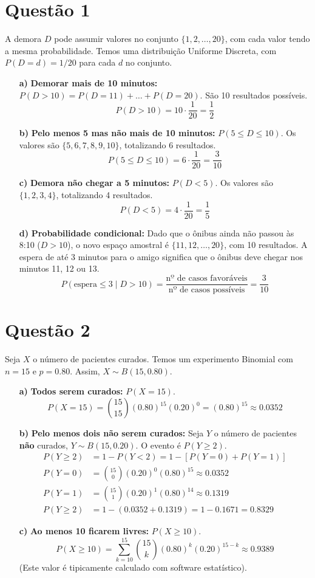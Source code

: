 \documentclass[12pt, a4paper]{article}
\begin{document}
\section*{Questão 1}
A demora $D$ pode assumir valores no conjunto $\{1, 2, \dots, 20\}$, com cada valor tendo a mesma probabilidade. Temos uma distribuição Uniforme Discreta, com $P(D=d) = 1/20$ para cada $d$ no conjunto.
\begin{itemize}
    \item[\textbf{a)}] \textbf{Demorar mais de 10 minutos:} $P(D > 10) = P(D=11) + \dots + P(D=20)$. São 10 resultados possíveis.
    $$ P(D > 10) = 10 \cdot \frac{1}{20} = \frac{1}{2} $$
    \item[\textbf{b)}] \textbf{Pelo menos 5 mas não mais de 10 minutos:} $P(5 \le D \le 10)$. Os valores são $\{5, 6, 7, 8, 9, 10\}$, totalizando 6 resultados.
    $$ P(5 \le D \le 10) = 6 \cdot \frac{1}{20} = \frac{3}{10} $$
    \item[\textbf{c)}] \textbf{Demora não chegar a 5 minutos:} $P(D < 5)$. Os valores são $\{1, 2, 3, 4\}$, totalizando 4 resultados.
    $$ P(D < 5) = 4 \cdot \frac{1}{20} = \frac{1}{5} $$
    \item[\textbf{d)}] \textbf{Probabilidade condicional:} Dado que o ônibus ainda não passou às 8:10 ($D > 10$), o novo espaço amostral é $\{11, 12, \dots, 20\}$, com 10 resultados. A espera de até 3 minutos para o amigo significa que o ônibus deve chegar nos minutos 11, 12 ou 13.
    $$ P(\text{espera} \le 3 \mid D > 10) = \frac{\text{nº de casos favoráveis}}{\text{nº de casos possíveis}} = \frac{3}{10} $$
\end{itemize}

\section*{Questão 2}
Seja $X$ o número de pacientes curados. Temos um experimento Binomial com $n=15$ e $p=0.80$. Assim, $X \sim B(15, 0.80)$.
\begin{itemize}
    \item[\textbf{a)}] \textbf{Todos serem curados:} $P(X=15)$.
    $$ P(X=15) = \binom{15}{15} (0.80)^{15} (0.20)^{0} = (0.80)^{15} \approx 0.0352 $$
    \item[\textbf{b)}] \textbf{Pelo menos dois não serem curados:} Seja $Y$ o número de pacientes \textbf{não} curados, $Y \sim B(15, 0.20)$. O evento é $P(Y \ge 2)$.
    \begin{align*}
    P(Y \ge 2) &= 1 - P(Y < 2) = 1 - [P(Y=0) + P(Y=1)] \\
    P(Y=0) &= \binom{15}{0} (0.20)^0 (0.80)^{15} \approx 0.0352 \\
    P(Y=1) &= \binom{15}{1} (0.20)^1 (0.80)^{14} \approx 0.1319 \\
    P(Y \ge 2) &= 1 - (0.0352 + 0.1319) = 1 - 0.1671 = 0.8329
    \end{align*}
    \item[\textbf{c)}] \textbf{Ao menos 10 ficarem livres:} $P(X \ge 10)$.
    $$ P(X \ge 10) = \sum_{k=10}^{15} \binom{15}{k} (0.80)^k (0.20)^{15-k} \approx 0.9389 $$
    (Este valor é tipicamente calculado com software estatístico).
\end{itemize}
\end{document}
